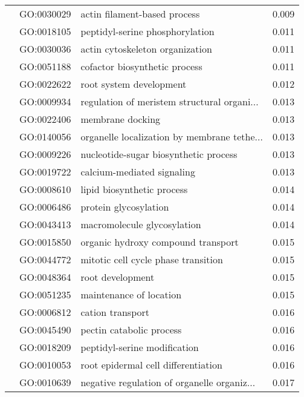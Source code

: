 \begin{longtable}{lllr}
   & GO:0030029 &                 actin filament-based process &         0.009 \\
   & GO:0018105 &              peptidyl-serine phosphorylation &         0.011 \\
   & GO:0030036 &              actin cytoskeleton organization &         0.011 \\
   & GO:0051188 &                cofactor biosynthetic process &         0.011 \\
   & GO:0022622 &                      root system development &         0.012 \\
   & GO:0009934 &  regulation of meristem structural organi... &         0.013 \\
   & GO:0022406 &                             membrane docking &         0.013 \\
   & GO:0140056 &  organelle localization by membrane tethe... &         0.013 \\
   & GO:0009226 &        nucleotide-sugar biosynthetic process &         0.013 \\
   & GO:0019722 &                   calcium-mediated signaling &         0.013 \\
   & GO:0008610 &                   lipid biosynthetic process &         0.014 \\
   & GO:0006486 &                        protein glycosylation &         0.014 \\
   & GO:0043413 &                  macromolecule glycosylation &         0.014 \\
   & GO:0015850 &           organic hydroxy compound transport &         0.015 \\
   & GO:0044772 &          mitotic cell cycle phase transition &         0.015 \\
   & GO:0048364 &                             root development &         0.015 \\
   & GO:0051235 &                      maintenance of location &         0.015 \\
   & GO:0006812 &                             cation transport &         0.016 \\
   & GO:0045490 &                     pectin catabolic process &         0.016 \\
   & GO:0018209 &                 peptidyl-serine modification &         0.016 \\
   & GO:0010053 &          root epidermal cell differentiation &         0.016 \\
   & GO:0010639 &  negative regulation of organelle organiz... &         0.017 \\

\end{longtable}
